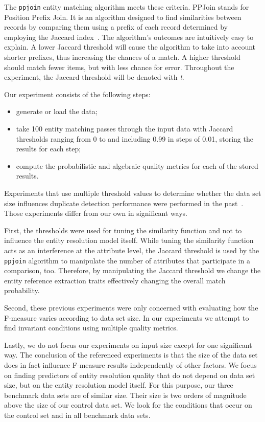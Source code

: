 The \texttt{ppjoin}\cite{ppjoin} entity matching algorithm meets these criteria.
PPJoin stands for Position Prefix Join.
It is an algorithm designed to find similarities between records by comparing
them using a prefix of each record determined by employing the Jaccard
index~\cite{jaccard1912,finley1996}.
The algorithm's outcomes are intuitively easy to explain.
A lower Jaccard threshold will cause the algorithm to take into account shorter
prefixes, thus increasing the chances of a match.
A higher threshold should match fewer items, but with less chance for error.
Throughout the experiment, the Jaccard threshold will be denoted with \textit{t}.


Our experiment consists of the following steps:

\begin{itemize}
    \item generate or load the data;
    \item take 100 entity matching passes through the input data with
          Jaccard thresholds ranging from 0 to and including 0.99 in steps of
          0.01, storing the results for each step;
    \item compute the probabilistic and algebraic quality metrics for each of
          the stored results.
\end{itemize}

Experiments that use multiple threshold values to determine whether the data
set size influences duplicate detection performance were performed in the
past~\cite{draisbach2013choosing}.
Those experiments differ from our own in significant ways.

First, the thresholds were used for tuning the similarity function and not to
influence the entity resolution model itself.
While tuning the similarity function acts as an interference at the attribute
level, the Jaccard threshold is used by the \texttt{ppjoin} algorithm
to manipulate the number of attributes that participate in a comparison, too.
Therefore, by manipulating the Jaccard threshold we change the entity reference
extraction traits effectively changing the overall match probability.

Second, these previous experiments were only concerned with evaluating how the
F-measure varies according to data set size.
In our experiments we attempt to find invariant conditions using multiple
quality metrics.

Lastly, we do not focus our experiments on input size except for one significant
way.
The conclusion of the referenced experiments is that the size of the data set
does in fact influence F-measure results independently of other factors.
We focus on finding predictors of entity resolution quality that do not depend
on data set size, but on the entity resolution model itself.
For this purpose, our three benchmark data sets are of similar size.
Their size is two orders of magnitude above the size of our control data set.
We look for the conditions that occur on the control set and in all benchmark
data sets.

